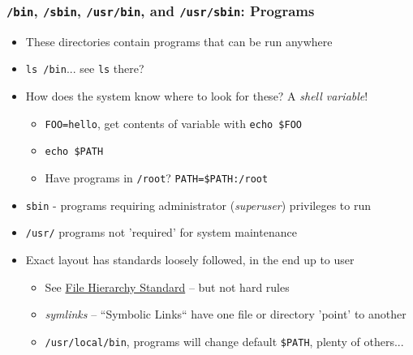 \documentclass{beamer} \usetheme{Madrid}
\begin{document}
\begin{frame}
    \frametitle{\texttt{/bin}, \texttt{/sbin}, \texttt{/usr/bin}, and \texttt{/usr/sbin}: Programs}
    \begin{itemize}
        \item These directories contain programs that can be run anywhere
        \item \texttt{ls /bin}... see \texttt{ls} there?
        \item How does the system know where to look for these? A \emph{shell variable}!
            \begin{itemize}
                \item \texttt{FOO=hello}, get contents of variable with \texttt{echo \$FOO}
                \item \texttt{echo \$PATH}
                \item Have programs in \texttt{/root}? \texttt{PATH=\$PATH:/root}
            \end{itemize}
        \item \texttt{sbin} - programs requiring administrator (\emph{superuser}) privileges to run
        \item \texttt{/usr/} programs not 'required' for system maintenance
        \item Exact layout has standards loosely followed, in the end up to user
            \begin{itemize}
                \item See \href{https://en.wikipedia.org/wiki/Filesystem_Hierarchy_Standard}{File Hierarchy Standard} -- but not hard rules
                \item \emph{symlinks} -- ``Symbolic Links`` have one file or directory 'point' to another
                \item \texttt{/usr/local/bin}, programs will change default \texttt{\$PATH}, plenty of others...
            \end{itemize}
    \end{itemize}
\end{frame}
\end{document}
